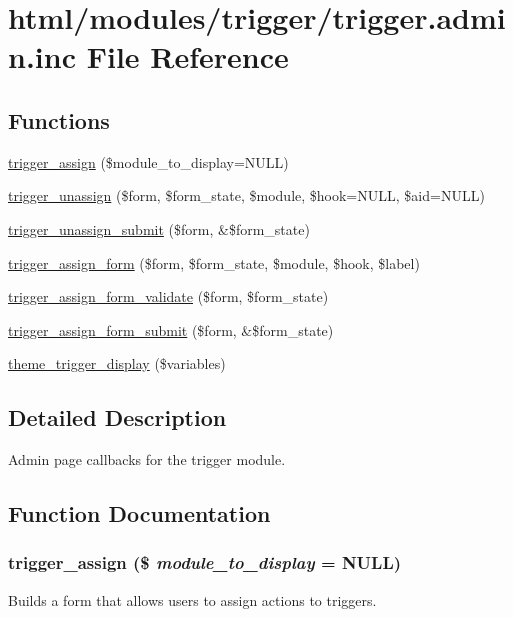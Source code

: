 \hypertarget{trigger_8admin_8inc}{
\section{html/modules/trigger/trigger.admin.inc File Reference}
\label{trigger_8admin_8inc}
}
\subsection*{Functions}
\begin{DoxyCompactItemize}
\item 
\hyperlink{trigger_8admin_8inc_a36d9aef026f4ce04b4d1df7e706d133c}{trigger\_\-assign} (\$module\_\-to\_\-display=NULL)
\item 
\hyperlink{group__forms_ga0ffa8d4daef7b89cd984be08c612856b}{trigger\_\-unassign} (\$form, \$form\_\-state, \$module, \$hook=NULL, \$aid=NULL)
\item 
\hyperlink{trigger_8admin_8inc_ae0e1a6cb2c032a6650a19c8d898896c0}{trigger\_\-unassign\_\-submit} (\$form, \&\$form\_\-state)
\item 
\hyperlink{group__forms_gab1bcec33dbc9ec1071f889662dfca03c}{trigger\_\-assign\_\-form} (\$form, \$form\_\-state, \$module, \$hook, \$label)
\item 
\hyperlink{trigger_8admin_8inc_ab8f232934437a99af0903a397c090934}{trigger\_\-assign\_\-form\_\-validate} (\$form, \$form\_\-state)
\item 
\hyperlink{trigger_8admin_8inc_adbb964aba3db9ae31067feff7af230ab}{trigger\_\-assign\_\-form\_\-submit} (\$form, \&\$form\_\-state)
\item 
\hyperlink{group__themeable_gae3ba9f8ddcdcd9514c5988e072a9334c}{theme\_\-trigger\_\-display} (\$variables)
\end{DoxyCompactItemize}


\subsection{Detailed Description}
Admin page callbacks for the trigger module. 

\subsection{Function Documentation}
\hypertarget{trigger_8admin_8inc_a36d9aef026f4ce04b4d1df7e706d133c}{
\subsubsection[{trigger\_\-assign}]{\setlength{\rightskip}{0pt plus 5cm}trigger\_\-assign (\$ {\em module\_\-to\_\-display} = {\ttfamily NULL})}}
\label{trigger_8admin_8inc_a36d9aef026f4ce04b4d1df7e706d133c}
Builds a form that allows users to assign actions to triggers.


